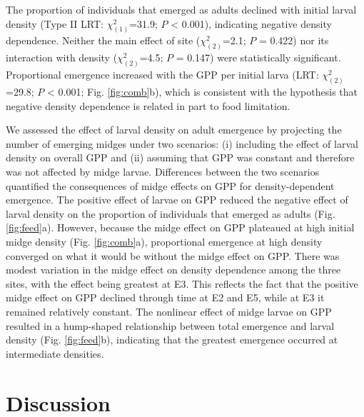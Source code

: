 \documentclass[12pt]{article}
\begin{document}
The proportion of individuals that emerged as adults declined with initial larval density 
(Type II LRT: $\chi^2_{(1)}$=31.9; $\textit{P}$ < 0.001), 
indicating negative density dependence.
Neither the main effect of site
($\chi^2_{(2)}$=2.1; $\textit{P}$ = 0.422)
nor its interaction with density 
($\chi^2_{(2)}$=4.5; $\textit{P}$ = 0.147) were statistically significant.
Proportional emergence increased with the GPP per initial larva 
(LRT: $\chi^2_{(2)}$=29.8; $\textit{P}$ < 0.001; Fig. \ref{fig:comb}b),
which is consistent with the hypothesis that negative density dependence is 
related in part to food limitation.

We assessed the effect of larval density on adult emergence 
by projecting the number of emerging midges under two scenarios: 
(i) including the effect of larval density on overall GPP
and (ii) assuming that GPP was constant and therefore was not affected by midge larvae.  
Differences between the two scenarios quantified the consequences of midge effects on GPP
for density-dependent emergence.
The positive effect of larvae on GPP
reduced the negative effect of larval density
on the proportion of individuals that emerged as adults
(Fig. \ref{fig:feed}a).
However, because the midge effect on GPP plateaued at high initial midge density 
(Fig. \ref{fig:comb}a),
proportional emergence at high density converged on what it would be 
without the midge effect on GPP.
There was modest variation in the midge effect 
on density dependence among the three sites, with the effect being greatest at E3. 
This reflects the fact that the positive midge effect 
on GPP declined through time at E2 and E5, 
while at E3 it remained relatively constant. 
The nonlinear effect of midge larvae on GPP resulted in a hump-shaped relationship
between total emergence and larval density (Fig. \ref{fig:feed}b),
indicating that the greatest emergence occurred at intermediate densities.







\section*{Discussion}
\end{document}
